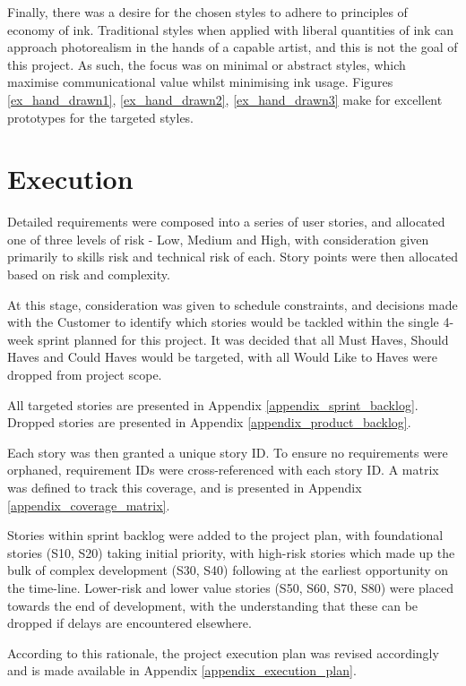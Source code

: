Finally, there was a desire for the chosen styles to adhere to principles of economy of ink.
Traditional styles when applied with liberal quantities of ink can approach photorealism in the hands of a capable artist, and this is not the goal of this project.
As such, the focus was on minimal or abstract styles, which maximise communicational value whilst minimising ink usage.
Figures \ref{ex_hand_drawn1}, \ref{ex_hand_drawn2}, \ref{ex_hand_drawn3} make for excellent prototypes for the targeted styles.

\section{Execution}\label{execution}

Detailed requirements were composed into a series of user stories, and allocated one of three levels of risk - Low, Medium and High, with consideration given primarily to skills risk and technical risk of each.
Story points were then allocated based on risk and complexity.

At this stage, consideration was given to schedule constraints, and decisions made with the Customer to identify which stories would be tackled within the single 4-week sprint planned for this project.
It was decided that all Must Haves, Should Haves and Could Haves would be targeted, with all Would Like to Haves were dropped from project scope.

All targeted stories are presented in Appendix \ref{appendix_sprint_backlog}. Dropped stories are presented in Appendix \ref{appendix_product_backlog}.

Each story was then granted a unique story ID. To ensure no requirements were orphaned, requirement IDs were cross-referenced with each story ID. 
A matrix was defined to track this coverage, and is presented in Appendix \ref{appendix_coverage_matrix}.

Stories within sprint backlog were added to the project plan, with foundational stories (S10, S20) taking initial priority, with high-risk stories which made up the bulk of complex development (S30, S40) following at the earliest opportunity on the time-line. 
Lower-risk and lower value stories (S50, S60, S70, S80) were placed towards the end of development, with the understanding that these can be dropped if delays are encountered elsewhere.

According to this rationale, the project execution plan was revised accordingly and is made available in Appendix \ref{appendix_execution_plan}.

